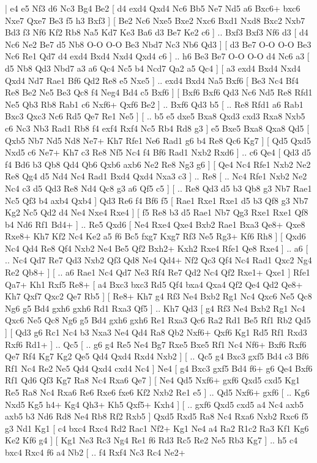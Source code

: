 \makegametitle 
|   e4   e5    Nf3   d6    Nc3   Bg4    Be2 [  d4 exd4  Qxd4 Nc6  Bb5 Ne7  Nd5 a6  Bxc6+ bxc6  Nxe7 Qxe7  Be3 f5  h3 Bxf3   ]  [  Be2 Nc6  Nxe5 Bxe2  Nxc6 Bxd1  Nxd8 Bxc2  Nxb7 Bd3  f3 Nf6  Kf2 Rb8  Na5 Kd7  Ke3 Ba6  d3 Be7  Ke2 c6   ] .. Bxf3    Bxf3   Nf6    d3 [  d4 Nc6  Ne2 Be7  d5 Nb8  O-O O-O  Be3 Nbd7  Nc3 Nb6  Qd3   ]  [  d3 Be7  O-O O-O  Be3 Nc6  Re1 Qd7  d4 exd4  Bxd4 Nxd4  Qxd4 c6   ] .. h6    Be3   Be7    O-O   O-O    d4   Nc6    a3 [  d5 Nb8  Qd3 Nbd7  a3 a6  Qc4 Nc5  b4 Ncd7  Qa2 a5  Qc4   ]  [  a3 exd4  Bxd4 Nxd4  Qxd4 Nd7  Rae1 Bf6  Qd2 Re8  e5 Nxe5   ] .. exd4    Bxd4   Na5    Bxf6 [  Be3 Nc4  Bf4 Re8  Be2 Ne5  Be3 Qc8  f4 Neg4  Bd4 c5  Bxf6   ]  [  Bxf6 Bxf6  Qd3 Nc6  Nd5 Re8  Rfd1 Ne5  Qb3 Rb8  Rab1 c6  Nxf6+ Qxf6  Be2   ] .. Bxf6    Qd3   b5 [ .. Re8  Rfd1 a6  Rab1 Bxc3  Qxc3 Nc6  Rd5 Qe7  Re1 Ne5   ]  [ .. b5  e5 dxe5  Bxa8 Qxd3  cxd3 Rxa8  Nxb5 c6  Nc3 Nb3  Rad1 Rb8  f4 exf4  Rxf4 Nc5  Rb4 Rd8  g3   ]  e5   Bxe5    Bxa8   Qxa8    Qd5 [  Qxb5 Nb7  Nd5 Nd8  Ne7+ Kh7  Rfe1 Ne6  Rad1 g6  b4 Re8  Qc6 Kg7   ]  [  Qd5 Qxd5  Nxd5 c6  Ne7+ Kh7  c3 Re8  Nf5 Nc4  f4 Bf6  Rad1 Nxb2  Rxd6   ] .. c6    Qe4 [  Qd3 d5  f4 Bd6  b3 Qb8  Qd4 Qb6  Qxb6 axb6  Ne2 Re8  Ng3 g6   ]  [  Qe4 Nc4  Rfe1 Nxb2  Ne2 Re8  Qg4 d5  Nd4 Nc4  Rad1 Bxd4  Qxd4 Nxa3  c3   ] .. Re8 [ .. Nc4  Rfe1 Nxb2  Ne2 Nc4  c3 d5  Qd3 Re8  Nd4 Qc8  g3 a6  Qf5 c5   ]  [ .. Re8  Qd3 d5  b3 Qb8  g3 Nb7  Rae1 Nc5  Qf3 b4  axb4 Qxb4   ]  Qd3   Re6    f4   Bf6    f5 [  Rae1 Rxe1  Rxe1 d5  b3 Qf8  g3 Nb7  Kg2 Nc5  Qd2 d4  Ne4 Nxe4  Rxe4   ]  [  f5 Re8  b3 d5  Rae1 Nb7  Qg3 Rxe1  Rxe1 Qf8  b4 Nd6  Rf1 Bd4+   ] .. Re5    Qxd6 [  Ne4 Rxe4  Qxe4 Bxb2  Rae1 Bxa3  Qe8+ Qxe8  Rxe8+ Kh7  Kf2 Nc4  Ke2 a5  f6 Bc5  fxg7 Kxg7  Rf3 Ne5  Rg3+ Kf6  Rh8   ]  [  Qxd6 Nc4  Qd4 Re8  Qf4 Nxb2  Ne4 Be5  Qf2 Bxh2+  Kxh2 Rxe4  Rfe1 Qe8  Rxe4   ] .. a6 [ .. Nc4  Qd7 Re7  Qd3 Nxb2  Qf3 Qd8  Ne4 Qd4+  Nf2 Qc3  Qf4 Nc4  Rad1 Qxc2  Ng4 Re2  Qb8+   ]  [ .. a6  Rae1 Nc4  Qd7 Ne3  Rf4 Re7  Qd2 Nc4  Qf2 Rxe1+  Qxe1   ]  Rfe1   Qa7+    Kh1   Rxf5    Re8+ [  a4 Bxc3  bxc3 Rd5  Qf4 bxa4  Qxa4 Qf2  Qe4 Qd2  Qe8+ Kh7  Qxf7 Qxc2  Qe7 Rb5   ]  [  Re8+ Kh7  g4 Rf3  Ne4 Bxb2  Rg1 Nc4  Qxc6 Ne5  Qc8 Ng6  g5 Bd4  gxh6 gxh6  Rd1 Rxa3  Qf5   ] .. Kh7   Qd3 [  g4 Rf3  Ne4 Bxb2  Rg1 Nc4  Qxc6 Ne5  Qc8 Ng6  g5 Bd4  gxh6 gxh6  Re1 Rxa3  Qc6 Ra2  Rd1 Be5  Rf1 Rb2  Qd5   ]  [  Qd3 g6  Rc1 Nc4  b3 Nxa3  Ne4 Qd4  Ra8 Qb2  Nxf6+ Qxf6  Kg1 Rd5  Rf1 Rxd3  Rxf6 Rd1+   ] .. Qc5 [ .. g6  g4 Re5  Ne4 Bg7  Rxe5 Bxe5  Rf1 Nc4  Nf6+ Bxf6  Rxf6 Qe7  Rf4 Kg7  Kg2 Qe5  Qd4 Qxd4  Rxd4 Nxb2   ]  [ .. Qc5  g4 Bxc3  gxf5 Bd4  c3 Bf6  Rf1 Nc4  Re2 Ne5  Qd4 Qxd4  cxd4 Nc4   ]  Ne4 [  g4 Bxc3  gxf5 Bd4  f6+ g6  Qe4 Bxf6  Rf1 Qd6  Qf3 Kg7  Ra8 Nc4  Rxa6 Qe7   ]  [  Ne4 Qd5  Nxf6+ gxf6  Qxd5 cxd5  Kg1 Re5  Ra8 Nc4  Rxa6 Re6  Rxe6 fxe6  Kf2 Nxb2  Re1 e5   ] .. Qd5    Nxf6+   gxf6 [ .. Kg6  Nxd5 Kg5  h4+ Kg4  Qh3+ Kh5  Qxf5+ Kxh4   ]  [ .. gxf6  Qxd5 cxd5  a4 Nc4  axb5 axb5  b3 Nd6  Rd8 Ne4  Rb8 Rf2  Rxb5   ]  Qxd5   Rxd5    Ra8   Nc4    Rxa6   Nxb2    Rxc6   f5    g3   Nd1    Kg1 [  c4 bxc4  Rxc4 Rd2  Rac1 Nf2+  Kg1 Ne4  a4 Ra2  R1c2 Ra3  Kf1 Kg6  Ke2 Kf6  g4   ]  [  Kg1 Ne3  Rc3 Ng4  Re1 f6  Rd3 Rc5  Re2 Ne5  Rb3 Kg7   ] .. h5    c4   bxc4    Rxc4   f6    a4   Nb2 [ .. f4  Rxf4 Nc3  Rc4 Ne2+ 
